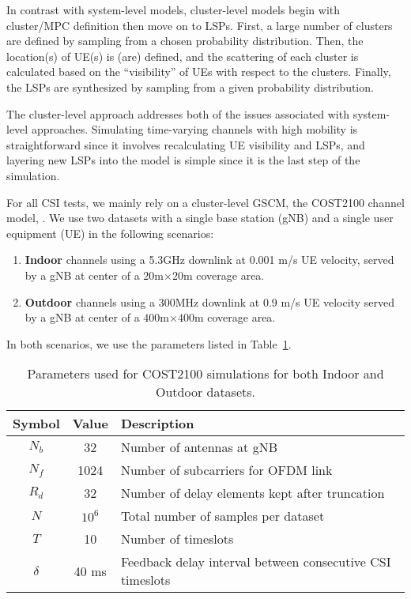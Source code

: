 In contrast with system-level models, cluster-level models begin with cluster/MPC definition then move on to LSPs. First, a large number of clusters are defined by sampling from a chosen probability distribution. Then, the location(s) of UE(s) is (are) defined, and the scattering of each cluster is calculated based on the ``visibility'' of UEs with respect to the clusters. Finally, the LSPs are synthesized by sampling from a given probability distribution.

The cluster-level approach addresses both of the issues associated with system-level approaches. Simulating time-varying channels with high mobility is straightforward since it involves recalculating UE visibility and LSPs, and layering new LSPs into the model is simple since it is the last step of the simulation.

For all CSI tests, we mainly rely on a cluster-level GSCM, the COST2100 channel model,  \cite{ref:liu2012cost2100}. We use two datasets with a single base station (gNB) and a single user equipment (UE) in the following scenarios:
\begin{enumerate}
	\item \textbf{Indoor} channels using a 5.3GHz downlink at
	0.001 m/s UE velocity, served by a
	gNB at center of a $20$m$\times 20$m coverage area.
	\item \textbf{Outdoor} channels using a 300MHz downlink at 0.9 m/s UE velocity served by a gNB at center 
	of a $400$m$\times 400$m coverage area.
\end{enumerate}
In both scenarios, we use the parameters listed in Table~\ref{tab:cost-params}.
\begin{table}[]
\centering
\caption{Parameters used for COST2100 simulations for both Indoor and Outdoor datasets.}
\label{tab:cost-params}
\begin{tabular}{c|c|l}
\toprule
\textbf{Symbol} & \textbf{Value} & \textbf{Description} \\ \midrule
$N_b$ 			& 32			 & Number of antennas at gNB  \\ \hline
$N_f$ 			& 1024			 & Number of subcarriers for OFDM link  \\ \hline
$R_d$ 			& 32			 & Number of delay elements kept after truncation  \\ \hline
$N$ 			& $10^6$		 & Total number of samples per dataset  \\ \hline
$T$ 			& 10		 	 & Number of timeslots  \\ \hline
$\delta$		& 40 ms			 & Feedback delay interval between consecutive CSI timeslots  \\ \bottomrule
\end{tabular}
\end{table}

